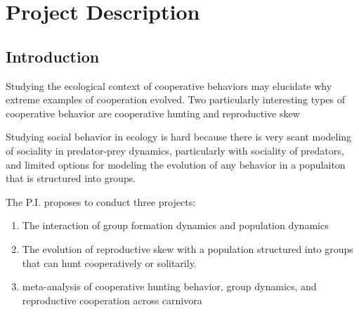 
\section{Project Description}
\subsection{Introduction}

Studying the ecological context of cooperative behaviors may elucidate why extreme examples of cooperation evolved. Two particularly interesting types of cooperative behavior are cooperative hunting and reproductive skew

Studying social behavior in ecology is hard because there is very scant modeling of sociality in predator-prey dynamics, particularly with sociality of predators, and limited options for modeling the evolution of any behavior in a populaiton that is structured into groups. 

The P.I. proposes to conduct three projects:
\begin{enumerate}
\item The interaction of group formation dynamics and population dynamics
\item The evolution of reproductive skew with a population structured into groups that can hunt cooperatively or solitarily.
\item meta-analysis of cooperative hunting behavior, group dynamics, and reproductive cooperation across carnivora
\end{enumerate}

